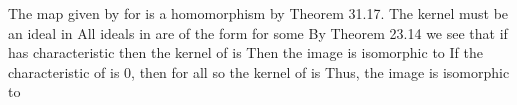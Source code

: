 \documentclass[11pt,oneside]{article}
\begin{document}
\begin{BookBody}
 The map  given by  for  is a homomorphism by Theorem 31.17. The kernel must be an ideal in  All ideals in  are of the form  for some  By Theorem 23.14 we see that if  has characteristic  then the kernel of \BookInline{\phi } is  Then the image  is isomorphic to  If the characteristic of  is 0, then  for all  so the kernel of \BookInline{\phi } is  Thus, the image  is isomorphic to \BookEnd{\blacklozenge}

\end{BookBody}

\BookNarrativetrue
\end{document}
